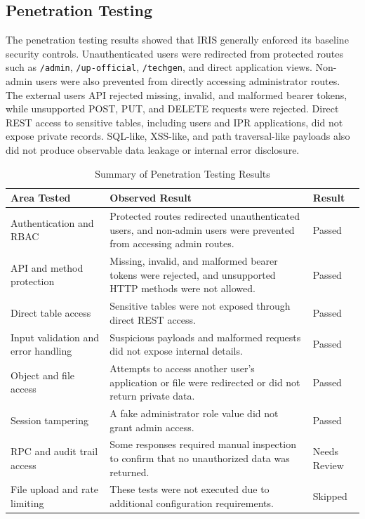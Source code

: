 \FloatBarrier

\subsection{Penetration Testing}

The penetration testing results showed that IRIS generally enforced its baseline security controls. Unauthenticated users were redirected from protected routes such as \texttt{/admin}, \texttt{/up-official}, \texttt{/techgen}, and direct application views. Non-admin users were also prevented from directly accessing administrator routes. The external users API rejected missing, invalid, and malformed bearer tokens, while unsupported POST, PUT, and DELETE requests were rejected. Direct REST access to sensitive tables, including users and IPR applications, did not expose private records. SQL-like, XSS-like, and path traversal-like payloads also did not produce observable data leakage or internal error disclosure.

\begingroup
\setlength{\tabcolsep}{6pt}
\renewcommand{\arraystretch}{1.12}
\small
\begin{table}[H]
\centering
\captionsetup{justification=raggedright,singlelinecheck=false}
\caption{Summary of Penetration Testing Results}
\label{tab:penetration-testing-summary}
\begin{tabular}{|p{}|p{}|p{}|}
\hline
\textbf{Area Tested} & \textbf{Observed Result} & \textbf{Result} \\
\hline
Authentication and RBAC & Protected routes redirected unauthenticated users, and non-admin users were prevented from accessing admin routes. & Passed \\
\hline
API and method protection & Missing, invalid, and malformed bearer tokens were rejected, and unsupported HTTP methods were not allowed. & Passed \\
\hline
Direct table access & Sensitive tables were not exposed through direct REST access. & Passed \\
\hline
Input validation and error handling & Suspicious payloads and malformed requests did not expose internal details. & Passed \\
\hline
Object and file access & Attempts to access another user's application or file were redirected or did not return private data. & Passed \\
\hline
Session tampering & A fake administrator role value did not grant admin access. & Passed \\
\hline
RPC and audit trail access & Some responses required manual inspection to confirm that no unauthorized data was returned. & Needs Review \\
\hline
File upload and rate limiting & These tests were not executed due to additional configuration requirements. & Skipped \\
\hline
\end{tabular}
\end{table}
\endgroup


